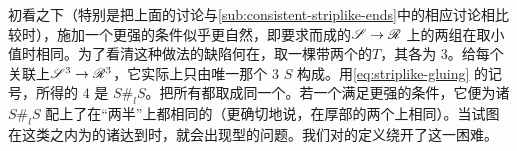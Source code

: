\begin{remark}\label{thm:stronger-consistency-remark}
初看之下（特别是把上面的讨论与\cref{sub:consistent-striplike-ends}中的相应讨论相比较时），施加一个更强的\trConsistency{}条件似乎更自然，即要求\trGluing{}而成的\trFamily{}$\mathscr{S}\to\mathscr{R}$ 上的两组\trPerturbationDatum{}在\trGluingParameter{}取小值时相同。为了看清这种做法的缺陷何在，取一棵带两个\trVertex{}的\trTree{}$T$，其\trValency{}各为 $3$。给每个\trVertex{}关联上\trFamily{}$\mathscr{S}^3\to\mathscr{R}^3$，它实际上只由唯一那个 $3$ \trPointedDisc{}$S$ 构成。用\eqref{eq:striplike-gluing} 的记号，所得的\trGluing{} $4$ \trPointedDisc{}是 $S\#_l S$。把所有\trLabel{}都取成同一个\trExact\trLagrange\trSubmanifold。若一个\trUniversal\trPerturbationDatum{}满足更强的\trConsistency{}条件，它便为诸\trDisk{}$S\#_l S$ 配上了在“两半”上都相同的\trPerturbationDatum（更确切地说，在厚部的两个\trConnectedComponent{}上相同）。当试图在这类\trPerturbationDatum{}之内为\trInhomogeneous\trPseudoholomorphicMap{}的诸\trModuliSpace{}达到\trRegularity{}时，就会出现\trMultipleCover{}型的问题。我们对\trConsistency{}的定义绕开了这一困难。
\end{remark}
